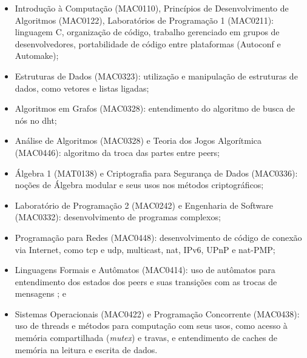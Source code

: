 \begin{itemize}
    \item Introdução à Computação (MAC0110), Princípios de Desenvolvimento de Algoritmos
        (MAC0122), Laboratórios de Programação 1 (MAC0211): linguagem C, organização de
        código, trabalho gerenciado em grupos de desenvolvedores, portabilidade de
        código entre plataformas (Autoconf e Automake);

    \item Estruturas de Dados (MAC0323): utilização e manipulação de estruturas de
        dados, como vetores e listas ligadas;

    \item Algoritmos em Grafos (MAC0328): entendimento do algoritmo de busca de nós no
        \gls{dht};

    \item Análise de Algoritmos (MAC0328) e Teoria dos Jogos Algorítmica (MAC0446):
        algoritmo da troca das partes entre \glspl{peer};

    \item Álgebra 1 (MAT0138) e Criptografia para Segurança de Dados (MAC0336): noções
        de Álgebra modular e seus usos nos métodos criptográficos;

    \item Laboratório de Programação 2 (MAC0242) e Engenharia de Software (MAC0332):
        desenvolvimento de programas complexos;

    \item Programação para Redes (MAC0448): desenvolvimento de código de conexão via
        Internet, como \gls{tcp} e \gls{udp}, multicast, \gls{nat}, IPv6, UPnP e
        \gls*{nat}-PMP;

    \item Linguagens Formais e Autômatos (MAC0414): uso de autômatos para entendimento
        dos estados dos \glspl*{peer} e suas transições com as trocas de mensagens
        \cite{conf:swarming}; e

    \item Sistemas Operacionais (MAC0422) e Programação Concorrente (MAC0438): uso de
        \glspl{thread} e métodos para computação com seus usos, como acesso à memória
        compartilhada (\emph{mutex}) e travas, e entendimento de caches de memória na
        leitura e escrita de dados.
\end{itemize}

\afterpage{\clearpage}